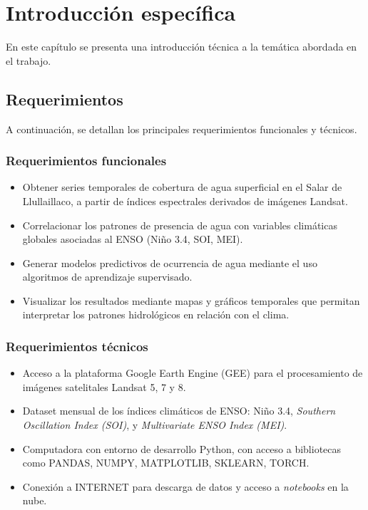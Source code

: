 \chapter{Introducción específica} %

\label{Chapter2}

En este capítulo se presenta una introducción técnica a la temática abordada en el trabajo. 

\section{Requerimientos}
\label{sec:ejemplo}
A continuación, se detallan los principales requerimientos funcionales y técnicos.

\subsection*{Requerimientos funcionales}

\begin{itemize}
\item Obtener series temporales de cobertura de agua superficial en el Salar de Llullaillaco, a partir de índices espectrales derivados de imágenes Landsat.
\item Correlacionar los patrones de presencia de agua con variables climáticas globales asociadas al ENSO (Niño 3.4, SOI, MEI).
\item Generar modelos predictivos de ocurrencia de agua mediante el uso algoritmos de aprendizaje supervisado.
\item Visualizar los resultados mediante mapas y gráficos temporales que permitan interpretar los patrones hidrológicos en relación con el clima.
\end{itemize}

\subsection*{Requerimientos técnicos}

\begin{itemize}
\item Acceso a la plataforma Google Earth Engine (GEE) para el procesamiento de imágenes satelitales Landsat 5, 7 y 8.
\item Dataset mensual de los índices climáticos de ENSO: Niño 3.4, \textit{Southern Oscillation Index (SOI)}, y \textit{Multivariate ENSO Index (MEI)}.
\item Computadora con entorno de desarrollo Python, con acceso a bibliotecas como PANDAS, NUMPY, MATPLOTLIB, SKLEARN, TORCH.
\item Conexión a INTERNET para descarga de datos y acceso a \textit{notebooks} en la nube.
\end{itemize}



